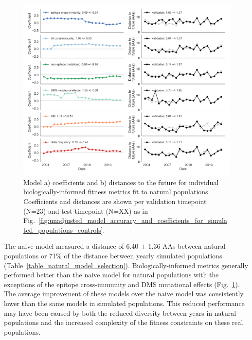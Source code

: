 \begin{figure}[ht]
  \begin{center}
  \includegraphics[width=\textwidth]{figures/unadjusted-model-accuracy-and-coefficients-for-natural-populations.png}
  \caption{
    Model a) coefficients and b) distances to the future for individual biologically-informed fitness metrics fit to natural populations.
    Coefficients and distances are shown per validation timepoint (N=23) and test timepoint (N=XX) as in Fig.~\ref{fig:unadjusted_model_accuracy_and_coefficients_for_simulated_populations_controls}.
  }
  \label{fig:unadjusted_model_accuracy_and_coefficients_for_natural_populations}
  \end{center}
\end{figure}

The naive model measured a distance of 6.40 $\pm$ 1.36 AAs between natural populations or 71\% of the distance between yearly simulated populations (Table~\ref{table_natural_model_selection}).
Biologically-informed metrics generally performed better than the naive model for natural populations with the exceptions of the epitope cross-immunity and DMS mutational effects (Fig.~\ref{fig:unadjusted_model_accuracy_and_coefficients_for_natural_populations}).
The average improvement of these models over the naive model was consistently lower than the same models in simulated populations.
This reduced performance may have been caused by both the reduced diversity between years in natural populations and the increased complexity of the fitness constraints on these real populations.

